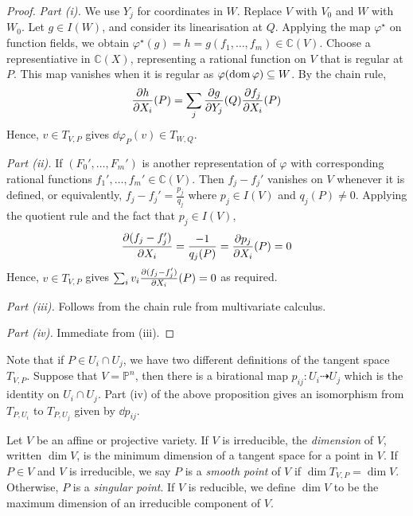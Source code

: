 \begin{proof}
    \emph{Part (i).}
    We use \( Y_j \) for coordinates in \( W \).
    Replace \( V \) with \( V_0 \) and \( W \) with \( W_0 \).
    Let \( g \in I(W) \), and consider its linearisation at \( Q \).
    Applying the map \( \varphi^\star \) on function fields, we obtain \( \varphi^\star(g) = h = g(f_1, \dots, f_m) \in \mathbb C(V) \).
    Choose a representiative in \( \mathbb C(X) \), representing a rational function on \( V \) that is regular at \( P \).
    This map vanishes when it is regular as \( \varphi(\operatorname{dom} \varphi) \subseteq W \).
    By the chain rule,
    \[ \pdv{h}{X_i}\qty(P) = \sum_j \pdv{g}{Y_j}\qty(Q) \pdv{f_j}{X_i}\qty(P) \]
    Hence, \( v \in T_{V,P} \) gives \( \dd{\varphi}_P(v) \in T_{W,Q} \).

    \emph{Part (ii).}
    If \( (F_0', \dots, F_m') \) is another representation of \( \varphi \) with corresponding rational functions \( f_1', \dots, f_m' \in \mathbb C(V) \).
    Then \( f_j - f_j' \) vanishes on \( V \) whenever it is defined, or equivalently, \( f_j - f_j' = \frac{p_j}{q_j} \) where \( p_j \in I(V) \) and \( q_j(P) \neq 0 \).
    Applying the quotient rule and the fact that \( p_j \in I(V) \),
    \[ \pdv{(f_j - f_j')}{X_i} = \frac{-1}{q_j(P)} = \pdv{p_j}{X_i}\qty(P) = 0 \]
    Hence, \( v \in T_{V,P} \) gives \( \sum_i v_i \pdv{(f_j - f_j')}{X_i}\qty(P) = 0 \) as required.

    \emph{Part (iii).}
    Follows from the chain rule from multivariate calculus.

    \emph{Part (iv).}
    Immediate from (iii).
\end{proof}
Note that if \( P \in U_i \cap U_j \), we have two different definitions of the tangent space \( T_{V,P} \).
Suppose that \( V = \mathbb P^n \), then there is a birational map \( p_{ij} \colon U_i \dashrightarrow U_j \) which is the identity on \( U_i \cap U_j \).
Part (iv) of the above proposition gives an isomorphism from \( T_{P,U_i} \) to \( T_{P,U_j} \) given by \( \dd{p}_{ij} \).
\begin{definition}
    Let \( V \) be an affine or projective variety.
    If \( V \) is irreducible, the \emph{dimension} of \( V \), written \( \dim V \), is the minimum dimension of a tangent space for a point in \( V \).
    If \( P \in V \) and \( V \) is irreducible, we say \( P \) is a \emph{smooth point} of \( V \) if \( \dim T_{V,P} = \dim V \).
    Otherwise, \( P \) is a \emph{singular point}.
    If \( V \) is reducible, we define \( \dim V \) to be the maximum dimension of an irreducible component of \( V \).
\end{definition}
